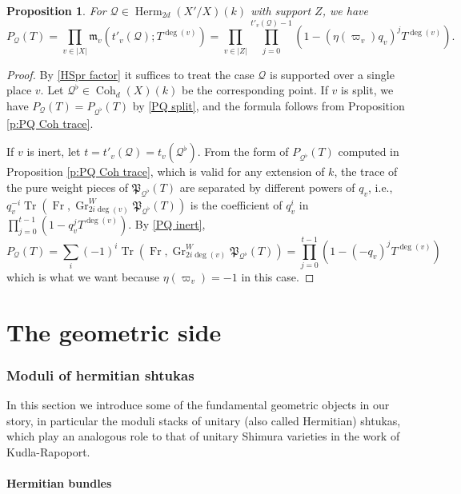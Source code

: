\documentclass[reqno]{amsart}
\numberwithin{equation}{section}
\DeclareMathOperator{\Frob}{Fr}
\DeclareMathOperator{\Tr}{Tr}
\DeclareMathOperator{\Gr}{Gr}
\DeclareMathOperator{\Herm}{Herm}
\DeclareMathOperator{\Coh}{Coh}
\newcommand{\y}{\eta}
\newcommand{\vp}{\varpi}
\newcommand\cQ{\mathcal{Q}}
\newcommand\frP{\mathfrak{P}}
\newcommand\fm{\mathfrak{m}}
\newtheorem{prop}[thm]{Proposition}
\theoremstyle{remark}
\numberwithin{equation}{section}
\begin{document}
\begin{prop}\label{p:PQ trace} For $\cQ\in \Herm_{2d}(X'/X)(k)$ with support $Z$, we have
\[
P_{\cQ}(T)=\prod_{v\in |X|}\fm_{v}(t'_{v}(\cQ); T^{\deg(v)}) = \prod_{v\in |Z|}\prod_{j=0}^{t'_{v}(\cQ)-1}(1-(\y(\vp_{v})q_{v})^{j}T^{\deg(v)}).
\]
\end{prop}
\begin{proof}
By \eqref{HSpr factor} it suffices to treat the case $\cQ$ is supported over a single place $v$. Let $\cQ^{\flat}\in \Coh_{d}(X)(k)$ be the corresponding point. If $v$ is split, we have $P_{\cQ}(T)=P_{\cQ^{\flat}}(T)$ by \eqref{PQ split}, and the formula follows from Proposition \ref{p:PQ Coh trace}. 

If $v$ is inert, let $t=t'_{v}(\cQ)=t_{v}(\cQ^{\flat})$. From the form of $P_{\cQ^{\flat}}(T)$ computed in Proposition \ref{p:PQ Coh trace}, which is valid for any extension of $k$,  the trace of the pure weight pieces of $\frP_{\cQ^{\flat}}(T)$ are separated by different powers of $q_{v}$, i.e., $q_{v}^{-i}\Tr(\Frob, \Gr^{W}_{2i\deg(v)}\frP_{\cQ^{\flat}}(T))$ is   the coefficient of $q_{v}^{i}$ in $\prod_{j=0}^{t-1}(1-q_{v}^{j}T^{\deg(v)})$.  By \eqref{PQ inert},
\begin{equation*}
P_{\cQ}(T)=\sum_{i}(-1)^{i}\Tr(\Frob, \Gr^{W}_{2i\deg(v)}\frP_{\cQ^{\flat}}(T)) =\prod_{j=0}^{t-1}(1-(-q_{v})^{j}T^{\deg(v)})
\end{equation*}
which is what we want because $\y(\vp_{v})=-1$ in this case.
\end{proof}


\part{The geometric side}



\section{Moduli of hermitian shtukas}\label{sec: unitary shtukas}

In this section we introduce some of the fundamental geometric objects in our story, in particular the moduli stacks of unitary (also called Hermitian) shtukas, which play an analogous role to that of unitary Shimura varieties in the work of Kudla-Rapoport. 

\subsection{Hermitian bundles}
\end{document}
